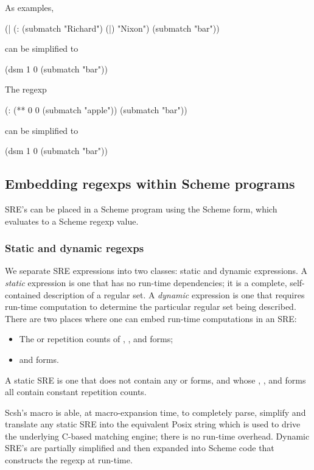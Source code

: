 As examples,
\begin{code}
(| (: (submatch "Richard") (|) "Nixon")
   (submatch "bar"))\end{code}%
%
can be simplified to
\begin{code}
(dsm 1 0 (submatch "bar"))\end{code}%
%
The regexp
\begin{code}
(: (** 0 0 (submatch "apple"))
   (submatch "bar"))\end{code}%
%
can be simplified to
\begin{code}
(dsm 1 0 (submatch "bar"))\end{code}%


\subsection{Embedding regexps within Scheme programs}

SRE's can be placed in a Scheme program using the 
Scheme form, which evaluates to a Scheme regexp value.

\subsubsection{Static and dynamic regexps}

We separate SRE expressions into two classes: static and dynamic
expressions. 
A \emph{static} expression is one that has no run-time dependencies;
it is a complete, self-contained description of a regular set. 
A \emph{dynamic} expression is one that requires run-time computation to 
determine the particular regular set being described.
There are two places where one can
embed run-time computations in an SRE:
\begin{itemize}
    \item The  or  repetition counts of 
        \ex{**}, \ex{=}, and \ex{>=} forms;
    \item {} and  forms.
\end{itemize}

A static SRE is one that does not contain any  or 
 forms, 
and whose \ex{**}, \ex{=}, and \ex{>=} forms all contain constant 
repetition counts.

Scsh's  macro is able, at macro-expansion time, to completely parse,
simplify and translate any static SRE into the equivalent Posix string
which is used to drive the underlying C-based matching engine; there is 
no run-time overhead. Dynamic SRE's are partially simplified and then expanded
into Scheme code that constructs the regexp at run-time.



